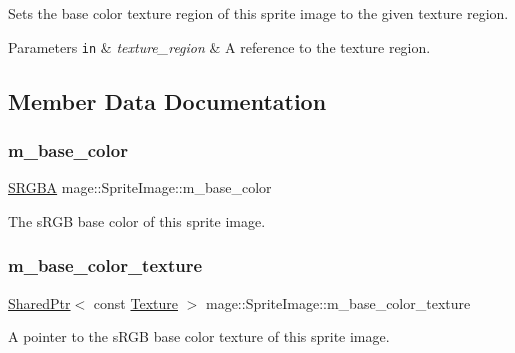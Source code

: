 Sets the base color texture region of this sprite image to the given texture region.


\begin{DoxyParams}[1]{Parameters}
\mbox{\tt in}  & {\em texture\+\_\+region} & A reference to the texture region. \\
\hline
\end{DoxyParams}


\subsection{Member Data Documentation}
\hypertarget{classmage_1_1_sprite_image_aa83cc38aa8a84e8fc434232b4223c236}{}\label{classmage_1_1_sprite_image_aa83cc38aa8a84e8fc434232b4223c236} 
\subsubsection{\texorpdfstring{m\+\_\+base\+\_\+color}{m\_base\_color}}
{\footnotesize\ttfamily \hyperlink{structmage_1_1_s_r_g_b_a}{S\+R\+G\+BA} mage\+::\+Sprite\+Image\+::m\+\_\+base\+\_\+color\hspace{0.3cm}{\ttfamily [private]}}

The s\+R\+GB base color of this sprite image. \hypertarget{classmage_1_1_sprite_image_a92f5b052561ca7d8fb317b8479d820a2}{}\label{classmage_1_1_sprite_image_a92f5b052561ca7d8fb317b8479d820a2} 
\subsubsection{\texorpdfstring{m\+\_\+base\+\_\+color\+\_\+texture}{m\_base\_color\_texture}}
{\footnotesize\ttfamily \hyperlink{namespacemage_a1e01ae66713838a7a67d30e44c67703e}{Shared\+Ptr}$<$ const \hyperlink{classmage_1_1_texture}{Texture} $>$ mage\+::\+Sprite\+Image\+::m\+\_\+base\+\_\+color\+\_\+texture\hspace{0.3cm}{\ttfamily [private]}}

A pointer to the s\+R\+GB base color texture of this sprite image. \hypertarget{classmage_1_1_sprite_image_ab921e099c41323969c86f7bac9c81f4f}{}\label{classmage_1_1_sprite_image_ab921e099c41323969c86f7bac9c81f4f} 
